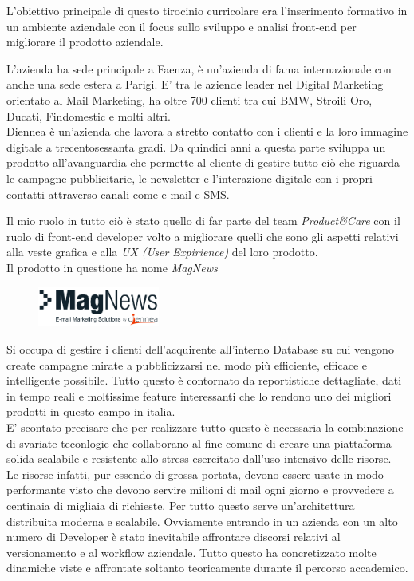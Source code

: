 \documentclass[a4paper]{article}
\begin{document}
\par L'obiettivo principale di questo tirocinio curricolare era l'inserimento formativo
in un ambiente aziendale con il focus sullo sviluppo e analisi front-end per
migliorare il prodotto aziendale.\\
\par L'azienda ha sede principale a Faenza, è un'azienda di fama internazionale con 
anche una sede estera a Parigi. E' tra le aziende leader nel Digital Marketing 
orientato al Mail Marketing, ha oltre 700 clienti tra cui BMW, Stroili Oro, Ducati,
 Findomestic e molti altri.\\
Diennea è un'azienda che lavora a stretto contatto con i clienti e la loro immagine digitale a 
trecentosessanta gradi. Da quindici anni a questa parte sviluppa un prodotto all'avanguardia
che permette al cliente di gestire tutto ciò che riguarda le campagne pubblicitarie, le newsletter e 
l'interazione digitale con i propri contatti attraverso canali come e-mail e SMS.\\
\par Il mio ruolo in tutto ciò è stato quello di far parte del team \emph{Product\&Care} con il ruolo di 
front-end developer volto a migliorare quelli che sono gli aspetti relativi alla 
veste grafica e alla \emph{UX (User Expirience)} del loro prodotto.\\
Il prodotto in questione ha nome \emph{MagNews}
\begin{figure}[H]
	\includegraphics[width=4cm]{magnews-diennea.png}
	\centering
\end{figure}
Si occupa di gestire i clienti dell'acquirente all'interno Database su cui vengono
create campagne mirate a pubblicizzarsi nel modo più efficiente, efficace e intelligente 
possibile. Tutto questo è contornato da reportistiche dettagliate, dati in tempo reali 
e moltissime feature interessanti che lo rendono uno dei migliori prodotti in questo
campo in italia.\\ 
E' scontato precisare che per realizzare tutto questo è necessaria la combinazione
di svariate teconlogie che collaborano al fine comune di creare una piattaforma solida
scalabile e resistente allo stress esercitato dall'uso intensivo delle risorse.\\
Le risorse infatti, pur essendo di grossa portata, devono essere usate in modo
performante visto che devono servire milioni di mail ogni giorno e provvedere a centinaia
di migliaia di richieste. Per tutto questo serve un'architettura distribuita moderna 
e scalabile. Ovviamente entrando in un azienda con un alto numero di Developer è 
stato inevitabile affrontare discorsi relativi al versionamento e al workflow aziendale. 
Tutto questo ha concretizzato molte dinamiche viste e affrontate soltanto teoricamente 
durante il percorso accademico. 
\end{document}
